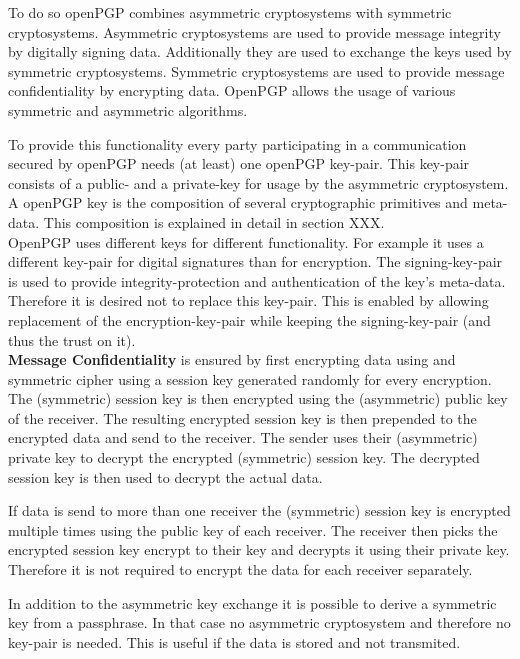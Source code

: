 To do so openPGP combines asymmetric cryptosystems with symmetric cryptosystems. Asymmetric cryptosystems are used to provide message integrity by digitally signing data. Additionally they are used to exchange the keys used by symmetric cryptosystems. Symmetric cryptosystems are used to provide message confidentiality by encrypting data. OpenPGP allows the usage of various symmetric and asymmetric algorithms. 


To provide this functionality every party participating in a communication secured by openPGP needs (at least) one openPGP key-pair. This key-pair consists of a public- and a private-key for usage by the asymmetric cryptosystem. A openPGP key is the composition of several cryptographic primitives and meta-data. This composition is explained in detail in section XXX. \\


OpenPGP uses different keys for different functionality. For example it uses a different key-pair for digital signatures than for encryption. The signing-key-pair is used to provide integrity-protection and authentication of the key's meta-data. Therefore it is desired not to replace this key-pair. This is enabled by allowing replacement of the encryption-key-pair while keeping the signing-key-pair (and thus the trust on it).\\


\textbf{Message Confidentiality} is ensured by first encrypting data using and symmetric cipher using a session key generated randomly for every encryption. The (symmetric) session key is then encrypted using the (asymmetric) public key of the receiver. The resulting encrypted session key is then prepended to the encrypted data and send to the receiver. The sender uses their (asymmetric) private key to decrypt the encrypted (symmetric) session key. The decrypted session key is then used to decrypt the actual data.

If data is send to more than one receiver the (symmetric) session key is encrypted  multiple times using the public key of each receiver. The receiver then picks the encrypted session key encrypt to their key and decrypts it using their private key. Therefore it is not required to encrypt the data for each receiver separately.

In addition to the asymmetric key exchange it is possible to derive a symmetric key from a passphrase. In that case no asymmetric cryptosystem and therefore no key-pair is needed. This is useful if the data is stored and not transmited.\\

